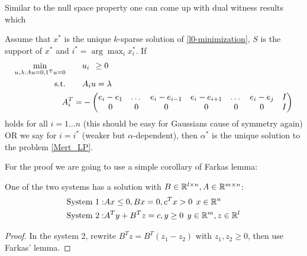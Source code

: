 \documentclass{article} %
\newcommand{\RN}{\R}
\begin{document}
Similar to the null space property one can come up with dual witness results which 
\begin{theorem}
\label{Maxmax_Oneblock}
Assume that $x^*$ is the unique $k$-sparse solution of \eqref{l0-minimization}, $S$ is the support of $x^*$ and $i^* = \arg\max_i x^*_i$. If
\begin{align*}
\min_{u,\lambda: Au = 0, 1^{\rm T} u = 0} \qquad & u_i \:\: \geq 0\\
\text{s.t.} \qquad& A_i u = \lambda\\
A_i^T = &-\begin{pmatrix} e_i - e_{1} & \dots & e_i - e_{i-1} & e_i - e_{i+1} & \dots & e_i - e_j & I\\
0 & 0 & 0&0&0&0& I
\end{pmatrix}
\end{align*}
holds for all $i = 1\dots n$ (this should be easy for Gaussians cause of symmetry again) OR we say for $i = i^*$ (weaker but $\alpha$-dependent), then $\alpha^*$ is the unique solution to the problem \eqref{Mert_LP}.
\end{theorem}
For the proof we are going to use a simple corollary of Farkas lemma:
\begin{lemma}
\label{Farkas_Corollary}
One of the two systems has a solution with $B \in \RN^{l\times n}, A\in \RN^{m\times n}$:
\begin{align*}
\text{System 1}: & Ax \leq 0, Bx = 0, c^Tx >0\:\: x\in \RN^n\\
\text{System 2}: & A^T y + B^T z = c, y\geq 0\:\: y\in \RN^m, z\in \RN^l
\end{align*}
\end{lemma}
\begin{proof}
In the system 2, rewrite $B^T z = B^T (z_1 - z_2)$ with $z_1,z_2 \geq 0$, then use Farkas' lemma. 
\end{proof}
\end{document}
